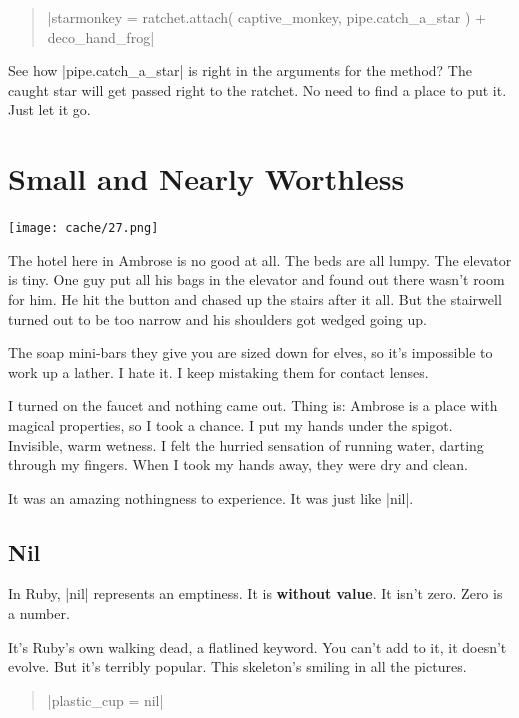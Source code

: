 \documentclass[12pt,twoside]{report}
\begin{document}
\begin{quote}
\rubyinline|starmonkey = ratchet.attach( captive_monkey, pipe.catch_a_star ) + deco_hand_frog|\end{quote}


See how \rubyinline|pipe.catch_a_star| is right in the
arguments for the method?  The caught star will get passed right to
the ratchet.  No need to find a place to put it.  Just let it go.

\bigskip




\section{Small and Nearly Worthless}


	\texttt{[image: cache/27.png]}

The hotel here in Ambrose is no good at all.  The beds are all
lumpy. The elevator is tiny.  One guy put all his bags in the elevator
and found out there wasn't room for him.  He hit the button and chased
up the stairs after it all.  But the stairwell turned out to be too
narrow and his shoulders got wedged going up.

The soap mini-bars they give you are sized down for elves, so it's
impossible to work up a lather.  I hate it.  I keep mistaking them for
contact lenses.

I turned on the faucet and nothing came out.  Thing is: Ambrose is a
place with magical properties, so I took a chance.  I put my hands
under the spigot.  Invisible, warm wetness.  I felt the hurried
sensation of running water, darting through my fingers.  When I took
my hands away, they were dry and clean.

It was an amazing nothingness to experience.  It was just like
\rubyinline|nil|.



\subsection{Nil}



In Ruby, \rubyinline|nil| represents an emptiness.  It
is {\bf without value}.  It isn't zero. Zero is a number.

It's Ruby's own walking dead, a flatlined keyword.  You can't add to
it, it doesn't evolve.  But it's terribly popular.  This skeleton's
smiling in all the pictures.

\begin{quote}
\rubyinline|plastic_cup = nil|\end{quote}
\end{document}
